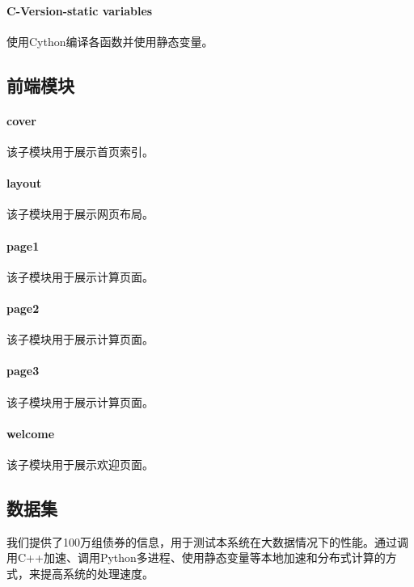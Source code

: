 \paragraph{C-Version-static variables}
使用Cython编译各函数并使用静态变量。


\subsection{前端模块}
\paragraph{cover}
该子模块用于展示首页索引。

\paragraph{layout}
该子模块用于展示网页布局。

\paragraph{page1}
该子模块用于展示计算页面。

\paragraph{page2}
该子模块用于展示计算页面。

\paragraph{page3}
该子模块用于展示计算页面。

\paragraph{welcome}
该子模块用于展示欢迎页面。

\subsection{数据集}
我们提供了100万组债券的信息，用于测试本系统在大数据情况下的性能。通过调用C++加速、调用Python多进程、使用静态变量等本地加速和分布式计算的方式，来提高系统的处理速度。